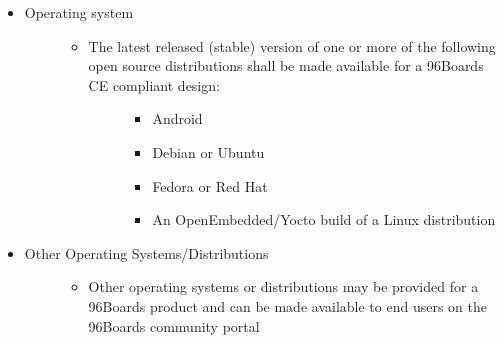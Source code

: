 \documentclass[a4paper,10pt,oneside,english]{sphinxmanual}
\begin{document}
\begin{description}
\begin{itemize}
\begin{description}
\begin{itemize}
\begin{description}
\begin{itemize}
\item {} 
\sphinxAtStartPar
The latest Google\sphinxhyphen{}supported Android kernel version

\item {} 
\sphinxAtStartPar
One of the last two kernel.org LTS kernels (for example Linaro LSK)

\end{itemize}

\end{description}

\end{itemize}

\end{description}

\item {} \begin{description}
\item[{Operating system}] \leavevmode\begin{itemize}
\item {} \begin{description}
\item[{The latest released (stable) version of one or more of the following open source distributions shall be made available for a 96Boards CE compliant design:}] \leavevmode\begin{itemize}
\item {} 
\sphinxAtStartPar
Android

\item {} 
\sphinxAtStartPar
Debian or Ubuntu

\item {} 
\sphinxAtStartPar
Fedora or Red Hat

\item {} 
\sphinxAtStartPar
An OpenEmbedded/Yocto build of a Linux distribution

\end{itemize}

\end{description}

\end{itemize}

\end{description}

\item {} \begin{description}
\item[{Other Operating Systems/Distributions}] \leavevmode\begin{itemize}
\item {} 
\sphinxAtStartPar
Other operating systems or distributions may be provided for a 96Boards product and can be made available to end users on the 96Boards community portal

\end{itemize}

\end{description}

\end{itemize}

\end{description}
\end{document}
